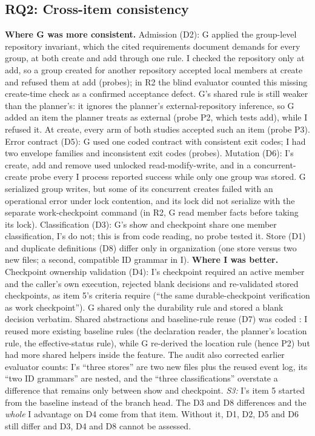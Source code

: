\documentclass[10pt,conference]{IEEEtran}
\newcommand{\G}{G}
\newcommand{\I}{I}
\begin{document}
\subsection{RQ2: Cross-item consistency}
\textbf{Where \G{} was more consistent.} Admission (D2): \G{} applied the group-level repository invariant, which the cited requirements document demands for every group, at both create and add through one rule. \I{} checked the repository only at add, so a group created for another repository accepted local members at create and refused them at add (probes); in R2 the blind evaluator counted this missing create-time check as a confirmed acceptance defect. \G's shared rule is still weaker than the planner's: it ignores the planner's external-repository inference, so \G{} added an item the planner treats as external (probe P2, which tests add), while \I{} refused it. At create, every arm of both studies accepted such an item (probe P3). %
Error contract (D5): \G{} used one coded contract with consistent exit codes; \I{} had two envelope families and inconsistent exit codes (probes). Mutation (D6): \I's create, add and remove used unlocked read-modify-write, and in a concurrent-create probe every \I{} process reported success while only one group was stored. \G{} serialized group writes, but some of its concurrent creates failed with an operational error under lock contention, and its lock did not serialize with the separate work-checkpoint command (in R2, \G{} read member facts before taking its lock). %
Classification (D3): \G's show and checkpoint share one member classification, \I's do not; this is from code reading, no probe tested it. Store (D1) and duplicate definitions (D8) differ only in organization (one store versus two new files; a second, compatible ID grammar in \I). %
\textbf{Where \I{} was better.} Checkpoint ownership validation (D4): \I's checkpoint required an active member and the caller's own execution, rejected blank decisions and re-validated stored checkpoints, as item 5's criteria require (``the same durable-checkpoint verification as work checkpoint''). \G{} shared only the durability rule and stored a blank decision verbatim. Shared abstractions and baseline-rule reuse (D7) was coded \ArchDSevenA: \I{} reused more existing baseline rules (the declaration reader, the planner's location rule, the effective-status rule), while \G{} re-derived the location rule (hence P2) but had more shared helpers inside the feature. %
The audit also corrected earlier evaluator counts: \I's ``three stores'' are two new files plus the reused event log, its ``two ID grammars'' are nested, and the ``three classifications'' overstate a difference that remains only between show and checkpoint. %
\emph{S3:} \I's item 5 started from the baseline instead of the branch head. The D3 and D8 differences and the \emph{whole} \I{} advantage on D4 come from that item. Without it, D1, D2, D5 and D6 still differ and D3, D4 and D8 cannot be assessed. %
\end{document}
